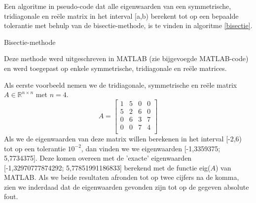 Een algoritme in pseudo-code dat alle eigenwaarden van een symmetrische, tridiagonale en re\"ele matrix in het interval [a,b) berekent tot op een bepaalde tolerantie met behulp van de bisectie-methode, is te vinden in algoritme \ref{bisectie}.

\begin{algorithm}
\centering
\caption{Bisectie-methode}
    \label{bisectie}
\begin{algorithmic}
\State{queue = [[a,b)]}

	\Else
    \EndIf
{}
\EndIf
\EndWhile
\end{algorithmic}
\end{algorithm}

Deze methode werd uitgeschreven in MATLAB (zie bijgevoegde MATLAB-code) en werd toegepast op enkele symmetrische, tridiagonale en re\"ele matrices.

Als eerste voorbeeld nemen we de tridiagonale, symmetrische en re\"ele matrix $A \in \mathbb{R}^{n \times n}$ met $n=4$.
$$A = \begin{bmatrix} 
1 &5 &0 &0 \\
5 &2 &6 &0 \\
0 &6 &3 &7 \\
0 &0 &7 &4 \\
\end{bmatrix}$$
Als we de eigenwaarden van deze matrix willen berekenen in het interval [-2,6) tot op een tolerantie $10^{-2}$, dan vinden we we eigenwaarden [-1,3359375; 5,7734375]. Deze komen overeen met de 'exacte' eigenwaarden [-1,32970777874292; 5,77851991186833] berekend met de functie eig($A$) van MATLAB. Als we beide resultaten afronden tot op twee cijfers na de komma, zien we inderdaad dat de eigenwaarden gevonden zijn tot op de gegeven absolute fout.

